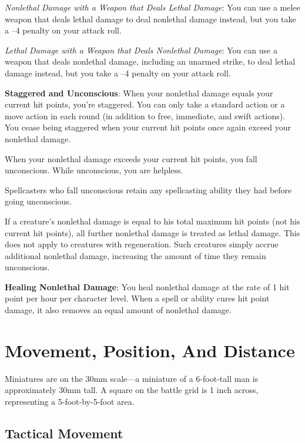 \textit{Nonlethal Damage with a Weapon that Deals Lethal Damage}: You can use a melee weapon that deals lethal damage to deal nonlethal damage instead, but you take a --4 penalty on your attack roll.
				
\textit{Lethal Damage with a Weapon that Deals Nonlethal Damage}: You can use a weapon that deals nonlethal damage, including an unarmed strike, to deal lethal damage instead, but you take a --4 penalty on your attack roll.
				
\textbf{Staggered and Unconscious}: When your nonlethal damage equals your current hit points, you're staggered. You can only take a standard action or a move action in each round (in addition to free, immediate, and swift actions). You cease being staggered when your current hit points once again exceed your nonlethal damage.
				
When your nonlethal damage exceeds your current hit points, you fall unconscious. While unconscious, you are helpless.
				
Spellcasters who fall unconscious retain any spellcasting ability they had before going unconscious.
				
If a creature's nonlethal damage is equal to his total maximum hit points (not his current hit points), all further nonlethal damage is treated as lethal damage. This does not apply to creatures with regeneration. Such creatures simply accrue additional nonlethal damage, increasing the amount of time they remain unconscious.
				
\textbf{Healing Nonlethal Damage}: You heal nonlethal damage at the rate of 1 hit point per hour per character level. When a spell or ability cures hit point damage, it also removes an equal amount of nonlethal damage.
				
\section{Movement, Position, And Distance}

				
Miniatures are on the 30mm scale---a miniature of a 6-foot-tall man is approximately 30mm tall. A square on the battle grid is 1 inch across, representing a 5-foot-by-5-foot area.
				
\subsection{Tactical Movement}

